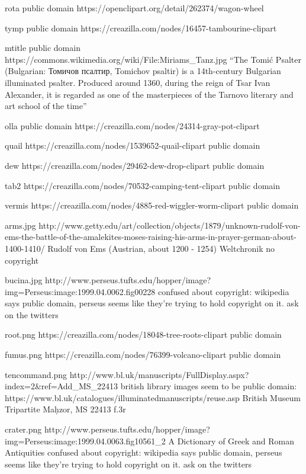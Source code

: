 rota
public domain
https://openclipart.org/detail/262374/wagon-wheel

tymp
public domain
https://creazilla.com/nodes/16457-tambourine-clipart

mtitle
public domain
https://commons.wikimedia.org/wiki/File:Miriams_Tanz.jpg
``The Tomić Psalter (Bulgarian: Томичов псалтир, Tomichov psaltir) is a 14th-century Bulgarian illuminated psalter. Produced around 1360, during the reign of Tsar Ivan Alexander, it is regarded as one of the masterpieces of the Tarnovo literary and art school of the time''

olla
public domain
https://creazilla.com/nodes/24314-gray-pot-clipart

quail
https://creazilla.com/nodes/1539652-quail-clipart
public domain

dew
https://creazilla.com/nodes/29462-dew-drop-clipart
public domain

tab2
https://creazilla.com/nodes/70532-camping-tent-clipart
public domain

vermis
https://creazilla.com/nodes/4885-red-wiggler-worm-clipart
public domain

arms.jpg
http://www.getty.edu/art/collection/objects/1879/unknown-rudolf-von-ems-the-battle-of-the-amalekites-moses-raising-his-arms-in-prayer-german-about-1400-1410/
Rudolf von Ems (Austrian, about 1200 - 1254)
Weltchronik
no copyright

bucina.jpg
http://www.perseus.tufts.edu/hopper/image?img=Perseus:image:1999.04.0062.fig00228
confused about copyright: wikipedia says public domain, perseus seems like they're trying to hold copyright on it.
ask on the twitters

root.png
https://creazilla.com/nodes/18048-tree-roots-clipart
public domain

fumus.png
https://creazilla.com/nodes/76399-volcano-clipart
public domain

tencommand.png
http://www.bl.uk/manuscripts/FullDisplay.aspx?index=2&ref=Add_MS_22413
british library images seem to be public domain: https://www.bl.uk/catalogues/illuminatedmanuscripts/reuse.asp
British Museum Tripartite Maḥzor, MS 22413 f.3r 

crater.png
http://www.perseus.tufts.edu/hopper/image?img=Perseus:image:1999.04.0063.fig10561_2
A Dictionary of Greek and Roman Antiquities
confused about copyright: wikipedia says public domain, perseus seems like they're trying to hold copyright on it.
ask on the twitters
